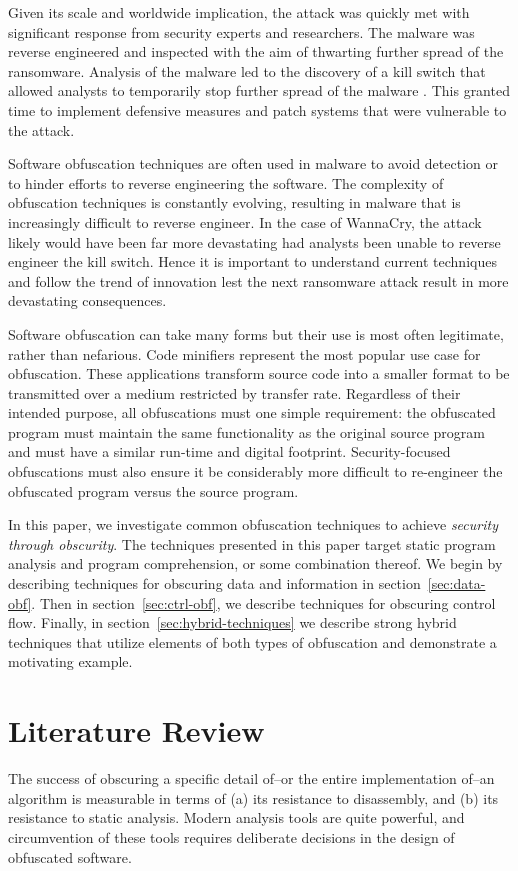\documentclass[conference]{IEEEtran}
\begin{document}
Given its scale and worldwide implication, the attack was quickly met with significant response from security experts and researchers. The malware was reverse engineered and inspected with the aim of thwarting further spread of the ransomware. Analysis of the malware led to the discovery of a kill switch that allowed analysts to temporarily stop further spread of the malware \cite{b2}. This granted time to implement defensive measures and patch systems that were vulnerable to the attack.

Software obfuscation techniques are often used in malware to avoid detection or to hinder efforts to reverse engineering the software. The complexity of obfuscation techniques is constantly evolving, resulting in malware that is increasingly difficult to reverse engineer. In the case of WannaCry, the attack likely would have been far more devastating had analysts been unable to reverse engineer the kill switch. Hence it is important to understand current techniques and follow the trend of innovation lest the next ransomware attack result in more devastating consequences.

Software obfuscation can take many forms but their use is most often legitimate, rather than nefarious. Code minifiers represent the most popular use case for obfuscation. These applications transform source code into a smaller format to be transmitted over a medium restricted by transfer rate. Regardless of their intended purpose, all obfuscations must one simple requirement: the obfuscated program must maintain the same functionality as the original source program and must have a similar run-time and digital footprint. Security-focused obfuscations must also ensure it be considerably more difficult to re-engineer the obfuscated program versus the source program.

In this paper, we investigate common obfuscation techniques to achieve \textit{security through obscurity}. The techniques presented in this paper target static program analysis and program comprehension, or some combination thereof. We begin by describing techniques for obscuring data and information in section~\ref{sec:data-obf}. Then in section~\ref{sec:ctrl-obf}, we describe techniques for obscuring control flow. Finally, in section~\ref{sec:hybrid-techniques} we describe strong hybrid techniques that utilize elements of both types of obfuscation and demonstrate a motivating example.

\section{Literature Review}
\label{sec:lit-review}
The success of obscuring a specific detail of--or the entire implementation of--an algorithm is measurable in terms of (a) its resistance to disassembly, and (b) its resistance to static analysis. Modern analysis tools are quite powerful, and circumvention of these tools requires deliberate decisions in the design of obfuscated software.
\end{document}
